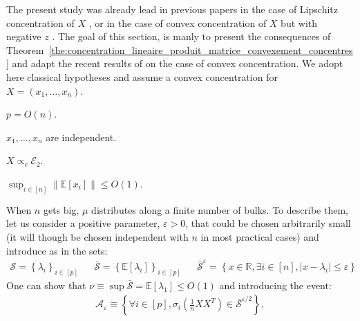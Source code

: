 \documentclass{ws-rmta}
\begin{document}
The present study was already lead in previous papers in the case of Lipschitz concentration of $X$ \cite{LOU21RHL}, or in the case of convex concentration of $X$ but with negative $z$ \cite{LOU19}. The goal of this section, is manly to present the consequences of Theorem~\ref{the:concentration_lineaire_produit_matrice_convexement_concentres} and adapt the recent results of \cite{LOU21RHL} on the case of convex concentration.
We adopt here classical hypotheses and assume a convex concentration for $X=(x_1,\ldots, x_n)$.
\begin{assumption}\label{ass:p_plus_petit_que_n}
  $p = O(n)$.
\end{assumption}
\begin{assumption}[Independence]\label{ass:independence_x_i}
  $x_1,\ldots, x_n$ are independent.
\end{assumption}
\begin{assumption}[Concentration]\label{ass:concentration_covexe_X}
  $X \propto_c \mathcal E_2$.
\end{assumption}
\begin{assumption}\label{ass:borne_x_i}  $\sup_{i\in [n]}\|\mathbb E[x_i]\| \leq O(1)$.
\end{assumption}
When $n$ gets big, $\mu$ distributes along a finite number of bulks. To describe them, let us consider a positive parameter, $\varepsilon>0$, that could be chosen arbitrarily small (it will though be chosen independent with $n$ in most practical cases) and introduce as in \cite{LOU21RHL} the sets:
\begin{align*}
  \mathcal S = \left\{\lambda_i\right\}_{i \in [p]} &
  &\bar{\mathcal S} = \left\{ \mathbb E[\lambda_i]\right\}_{i \in [p]} &
  &\bar{\mathcal S}^\varepsilon = \left\{ x \in \mathbb R, \exists i \in [n], |x - \lambda_i | \leq \varepsilon \right\}
\end{align*}
One can show that $\nu \equiv \sup \bar{\mathcal S} = \mathbb E[\lambda_1] \leq O(1)$ and introducing the event:
\begin{align*}
  \mathcal A_\varepsilon \equiv \left\{ \forall i \in[p], \sigma_i \left( \frac{1}{n}XX^T \right) \in \bar{\mathcal S}^{\varepsilon/2} \right\},
\end{align*}
\end{document}
